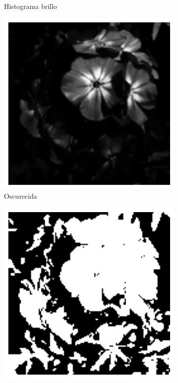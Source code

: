 \documentclass{article}
\begin{document}
\begin{figure}
\begin{subfigure}[b]{0.24\textwidth}
		\caption{Histograma brillo}
		\label{fg:brightHist}
	\end{subfigure}
	\begin{subfigure}[b]{0.24\textwidth}
		\includegraphics[width= \textwidth]{imgGrau3p5exp}
		\caption{Oscurecida}
		\label{fg:imgGrau3p5exp}
	\end{subfigure}
	\begin{subfigure}[b]{0.24\textwidth}
		\includegraphics[width= \textwidth]{imgGrau0binarizada}

\end{subfigure}
\end{figure}
\end{document}
